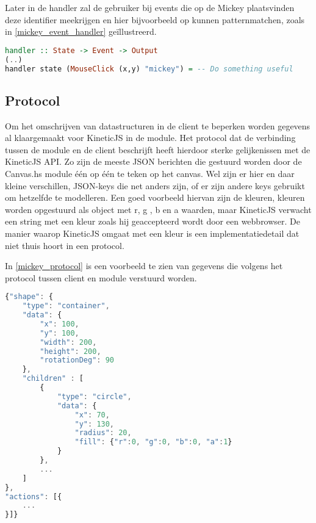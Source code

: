 Later in de handler zal de gebruiker bij events die op de Mickey plaatsvinden deze identifier meekrijgen en hier bijvoorbeeld op kunnen patternmatchen, zoals in \autoref{mickey_event_handler} geïllustreerd.

\begin{lstlisting}[style=densecode, language=Haskell, caption=Event handler voor een specifieke shape, label=mickey_event_handler]
handler :: State -> Event -> Output
(..)
handler state (MouseClick (x,y) "mickey") = -- Do something useful
\end{lstlisting}


\subsection{Protocol}
Om het omschrijven van datastructuren in de client te beperken worden gegevens al klaargemaakt voor KineticJS in de module. Het protocol dat de verbinding tussen de module en de client beschrijft heeft hierdoor sterke gelijkenissen met de KineticJS API. Zo zijn de meeste JSON berichten die gestuurd worden door de Canvas.hs module één op één te teken op het canvas. Wel zijn er hier en daar kleine verschillen, JSON-keys die net anders zijn, of er zijn andere keys gebruikt om hetzelfde te modelleren. Een goed voorbeeld hiervan zijn de kleuren, kleuren worden opgestuurd als object met r, g , b en a waarden, maar KineticJS verwacht een string met een kleur zoals hij geaccepteerd wordt door een webbrowser. De manier waarop KineticJS omgaat met een kleur is een implementatiedetail dat niet thuis hoort in een protocol.

In \autoref{mickey_protocol} is een voorbeeld te zien van gegevens die volgens het protocol tussen client en module verstuurd worden.

\begin{lstlisting}[style=densecode, language=JavaScript, caption=Gegevens verstuurd volgens het protocol, label=mickey_protocol]
{"shape": {
    "type": "container",
    "data": {
        "x": 100,
        "y": 100,
        "width": 200,
        "height": 200,
        "rotationDeg": 90
    },
    "children" : [
        {
            "type": "circle",
            "data": {
                "x": 70,
                "y": 130,
                "radius": 20,
                "fill": {"r":0, "g":0, "b":0, "a":1}
            }
        },
        ...
    ]
},
"actions": [{
    ...
}]}
\end{lstlisting}
